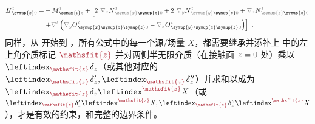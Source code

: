 \begin{subequations}
\begin{align}
	H^{\;\!\mathcolor{gray}{t}}_{\;\! \symup{z} \mathcolor{gray}{0}} = & - M^{\;\!\mathcolor{gray}{t}}_{\;\! \symup{\iota} \mathcolor{gray}{z}} + \left[ 2~ \mathcolor{gray}{\nabla_x}
	N^{\;\!\mathcolor{gray}{t}}_{\;\! \mathcolor{gray}{\symup{x}}\symup{z} \mathcolor{gray}{0}} + 2~ \mathcolor{gray}{\nabla_y} N^{\;\!\mathcolor{gray}{t}}_{\;\! \mathcolor{gray}{\symup{y}} \symup{z} \mathcolor{gray}{0}} + \mathcolor{gray}{\nabla_z} N^{\;\!\mathcolor{gray}{t}}_{\;\! \mathcolor{gray}{\symup{z}} \symup{z} \mathcolor{gray}{0}} \right. \label{eq:H_z0=} \\ & \left. + \mathcolor{gray}{\nabla^t} \left( \mathcolor{gray}{\nabla_y}
	O^{\;\!\mathcolor{gray}{t}}_{\;\! \symup{x}\symup{z}\symup{z} \mathcolor{gray}{0}} - \mathcolor{gray}{\nabla_x}
	O^{\;\!\mathcolor{gray}{t}}_{\;\! \symup{y}\symup{z}\symup{z}\mathcolor{gray}{0}} \right) \right]~.
\end{align}
\end{subequations}
同样，从  开始到 ，所有公式中的每一个源/场量 $X$，都需要继承并添补上  中的左上角介质标记 $\textcolor{Maroon}{\mathsfit{z}}$ 并对两侧半无限介质（在接触面 $\mathcolor{gray}{z \mathcolor{black}{=} 0}$ 处）乘以 $\leftindex_{\textcolor{Maroon}{\mathsfit{z}}} \;\! \delta_{\mathcolor{gray}{z}}$（或其他对应的 $\leftindex_{\textcolor{Maroon}{\mathsfit{z}}} \;\! \delta'_{\mathcolor{gray}{z}},\leftindex_{\textcolor{Maroon}{\mathsfit{z}}} \;\! \delta''_{\mathcolor{gray}{z}}$）并求和以成为 $\leftindex_{\textcolor{Maroon}{\mathsfit{z}}} \;\! \delta_{\mathcolor{gray}{z}} \leftindex^{\textcolor{Maroon}{\mathsfit{z}}} X$（或 $\leftindex_{\textcolor{Maroon}{\mathsfit{z}}} \;\! \delta'_{\mathcolor{gray}{z}} \leftindex^{\textcolor{Maroon}{\mathsfit{z}}} X,\leftindex_{\textcolor{Maroon}{\mathsfit{z}}} \;\! \delta''_{\mathcolor{gray}{z}} \leftindex^{\textcolor{Maroon}{\mathsfit{z}}} X$），才是有效的约束，和完整的边界条件。

